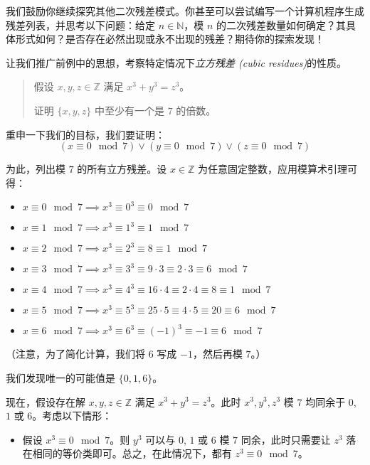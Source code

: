 \begin{example}
    我们鼓励你继续探究其他二次残差模式。你甚至可以尝试编写一个计算机程序生成残差列表，并思考以下问题：给定 $n \in \mathbb{N}$，模 $n$ 的二次残差数量如何确定？其具体形式如何？是否存在必然出现或永不出现的残差？期待你的探索发现！
\end{example}

\begin{example}
    让我们推广前例中的思想，考察特定情况下\emph{立方残差 (cubic residues)}的性质。
    \begin{quotation}
        假设 $x, y, z \in \mathbb{Z}$ 满足 $x^3+y^3=z^3$。

        证明 $\{x, y, z\}$ 中至少有一个是 $7$ 的倍数。
    \end{quotation}

    重申一下我们的目标，我们要证明：
    \[(x \equiv 0 \mod 7) \lor (y \equiv 0 \mod 7) \lor (z \equiv 0 \mod 7)\]

    为此，列出模 $7$ 的所有立方残差。设 $x \in \mathbb{Z}$ 为任意固定整数，应用模算术引理可得：
    \begin{itemize}
        \item $x \equiv 0 \mod 7 \implies x^3 \equiv 0^3 \equiv 0 \mod 7$
        \item $x \equiv 1 \mod 7 \implies x^3 \equiv 1^3 \equiv 1 \mod 7$
        \item $x \equiv 2 \mod 7 \implies x^3 \equiv 2^3 \equiv 8 \equiv 1 \mod 7$
        \item $x \equiv 3 \mod 7 \implies x^3 \equiv 3^3 \equiv 9 \cdot 3 \equiv 2 \cdot 3 \equiv 6 \mod 7$
        \item $x \equiv 4 \mod 7 \implies x^3 \equiv 4^3 \equiv 16 \cdot 4 \equiv 2 \cdot 4 \equiv 8 \equiv 1 \mod 7$
        \item $x \equiv 5 \mod 7 \implies x^3 \equiv 5^3 \equiv 25 \cdot 5 \equiv 4 \cdot 5 \equiv 20 \equiv 6 \mod 7$
        \item $x \equiv 6 \mod 7 \implies x^3 \equiv 6^3 \equiv (-1)^3 \equiv -1 \equiv 6 \mod 7$
    \end{itemize}

    （注意，为了简化计算，我们将 $6$ 写成 $-1$，然后再模 $7$。）

    我们发现唯一的可能值是 $\{0, 1, 6\}$。

    现在，假设存在解 $x, y, z \in \mathbb{Z}$ 满足 $x^3 + y^3 = z^3$。此时 $x^3,y^3,z^3$ 模 $7$ 均同余于 $0$, $1$ 或 $6$。考虑以下情形：
    \begin{itemize}
        \item 假设 $x^3 \equiv 0 \mod 7$。则 $y^3$ 可以与 $0$, $1$ 或 $6$ 模 $7$ 同余，此时只需要让 $z^3$ 落在相同的等价类即可。总之，在此情况下，都有 $z^3 \equiv 0 \mod 7$。
        

\end{itemize}
\end{example}
